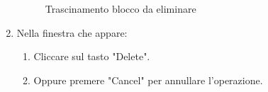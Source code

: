 \begin{enumerate}
\begin{figure}[!ht]
		\centering
		\caption{Trascinamento blocco da eliminare}
	\end{figure}
	\item Nella finestra che appare:
	\begin{enumerate}
		\item Cliccare sul tasto "Delete".
		\item Oppure premere "Cancel" per annullare l'operazione.
	\end{enumerate}
	\begin{figure}[!ht]
		\centering

\end{figure}
\end{enumerate}
